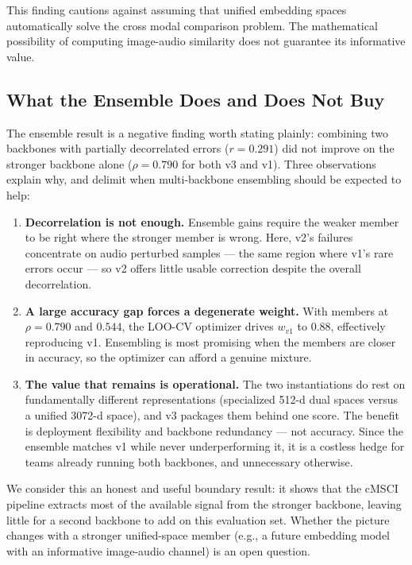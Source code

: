 \documentclass[a4paper,fleqn]{cas-sc}
\begin{document}
\begin{itemize}
This finding cautions against assuming that unified embedding spaces automatically solve the cross modal comparison problem. The mathematical possibility of computing image-audio similarity does not guarantee its informative value.

\subsection{What the Ensemble Does and Does Not Buy}\label{sec:ensemble-discussion}

The ensemble result is a negative finding worth stating plainly: combining two backbones with partially decorrelated errors ($r = 0.291$) did not improve on the stronger backbone alone ($\rho = 0.790$ for both v3 and v1). Three observations explain why, and delimit when multi-backbone ensembling should be expected to help:

\begin{enumerate}
\item \textbf{Decorrelation is not enough.} Ensemble gains require the weaker member to be right where the stronger member is wrong. Here, v2's failures concentrate on audio perturbed samples — the same region where v1's rare errors occur — so v2 offers little usable correction despite the overall decorrelation.

\item \textbf{A large accuracy gap forces a degenerate weight.} With members at $\rho = 0.790$ and $0.544$, the LOO-CV optimizer drives $w_{v1}$ to 0.88, effectively reproducing v1. Ensembling is most promising when the members are closer in accuracy, so the optimizer can afford a genuine mixture.

\item \textbf{The value that remains is operational.} The two instantiations do rest on fundamentally different representations (specialized 512-d dual spaces versus a unified 3072-d space), and v3 packages them behind one score. The benefit is deployment flexibility and backbone redundancy — not accuracy. Since the ensemble matches v1 while never underperforming it, it is a costless hedge for teams already running both backbones, and unnecessary otherwise.
\end{enumerate}

We consider this an honest and useful boundary result: it shows that the cMSCI pipeline extracts most of the available signal from the stronger backbone, leaving little for a second backbone to add on this evaluation set. Whether the picture changes with a stronger unified-space member (e.g., a future embedding model with an informative image-audio channel) is an open question.


\end{itemize}
\end{document}
